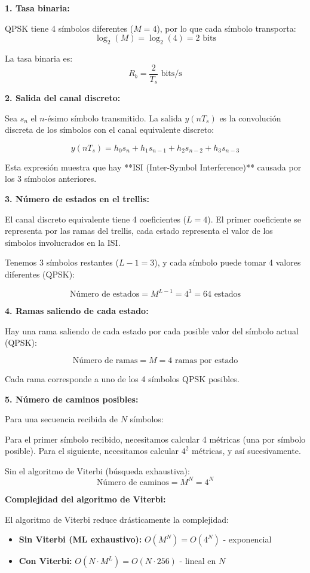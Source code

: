 \documentclass[10pt,a4paper]{article}
\begin{document}
\begin{solucion}
\textbf{1. Tasa binaria:}

QPSK tiene 4 símbolos diferentes ($M = 4$), por lo que cada símbolo transporta:
\[
\log_2(M) = \log_2(4) = 2\text{ bits}
\]

La tasa binaria es:
\[
\boxed{R_b = \frac{2}{T_s}\text{ bits/s}}
\]

\textbf{2. Salida del canal discreto:}

Sea $s_n$ el $n$-ésimo símbolo transmitido. La salida $y(nT_s)$ es la convolución discreta de los símbolos con el canal equivalente discreto:

\[
\boxed{y(nT_s) = h_0 s_n + h_1 s_{n-1} + h_2 s_{n-2} + h_3 s_{n-3}}
\]

Esta expresión muestra que hay **ISI (Inter-Symbol Interference)** causada por los 3 símbolos anteriores.

\textbf{3. Número de estados en el trellis:}

El canal discreto equivalente tiene 4 coeficientes ($L = 4$). El primer coeficiente se representa por las ramas del trellis, cada estado representa el valor de los símbolos involucrados en la ISI.

Tenemos 3 símbolos restantes ($L - 1 = 3$), y cada símbolo puede tomar 4 valores diferentes (QPSK):

\[
\boxed{\text{Número de estados} = M^{L-1} = 4^3 = 64\text{ estados}}
\]

\textbf{4. Ramas saliendo de cada estado:}

Hay una rama saliendo de cada estado por cada posible valor del símbolo actual (QPSK):

\[
\boxed{\text{Número de ramas} = M = 4\text{ ramas por estado}}
\]

Cada rama corresponde a uno de los 4 símbolos QPSK posibles.

\textbf{5. Número de caminos posibles:}

Para una secuencia recibida de $N$ símbolos:

Para el primer símbolo recibido, necesitamos calcular 4 métricas (una por símbolo posible).
Para el siguiente, necesitamos calcular $4^2$ métricas, y así sucesivamente.

Sin el algoritmo de Viterbi (búsqueda exhaustiva):
\[
\boxed{\text{Número de caminos} = M^N = 4^N}
\]

\textbf{Complejidad del algoritmo de Viterbi:}

El algoritmo de Viterbi reduce drásticamente la complejidad:
\begin{itemize}
\item \textbf{Sin Viterbi (ML exhaustivo):} $O(M^N) = O(4^N)$ - exponencial
\item \textbf{Con Viterbi:} $O(N \cdot M^L) = O(N \cdot 256)$ - lineal en $N$
\end{itemize}


\end{solucion}
\end{document}
